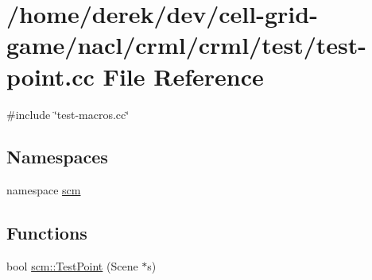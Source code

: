 \hypertarget{test-point_8cc}{
\section{/home/derek/dev/cell-\/grid-\/game/nacl/crml/crml/test/test-\/point.cc File Reference}
\label{test-point_8cc}
}
{\ttfamily \#include \char`\"{}test-\/macros.cc\char`\"{}}\par
\subsection*{Namespaces}
\begin{DoxyCompactItemize}
\item 
namespace \hyperlink{namespacescm}{scm}
\end{DoxyCompactItemize}
\subsection*{Functions}
\begin{DoxyCompactItemize}
\item 
bool \hyperlink{namespacescm_aca67b9b84fd6253da0c69b4c521e6bc6}{scm::TestPoint} (Scene $\ast$s)
\end{DoxyCompactItemize}
